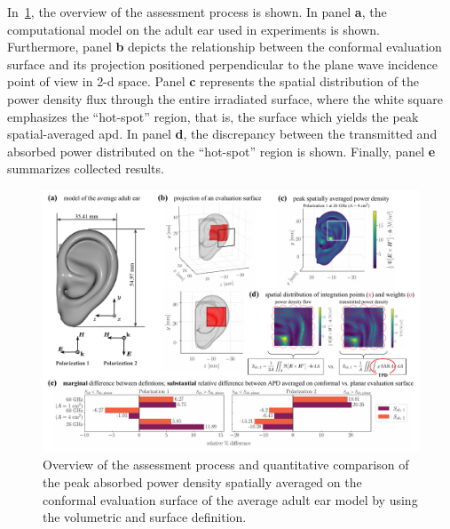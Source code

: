 In~\cref{fig:Kapetanovic2022JERM}, the overview of the assessment process is shown.
In panel \textbf{a}, the computational model on the adult ear used in experiments is shown.
Furthermore, panel \textbf{b} depicts the relationship between the conformal evaluation surface and its projection positioned perpendicular to the plane wave incidence point of view in \gls{2-d} space.
Panel \textbf{c} represents the spatial distribution of the power density flux through the entire irradiated surface, where the white square emphasizes the ``hot-spot'' region, that is, the surface which yields the peak spatial-averaged \gls{apd}.
In panel \textbf{d}, the discrepancy between the transmitted and absorbed power distributed on the ``hot-spot'' region is shown.
Finally, panel \textbf{e} summarizes collected results.
\begin{figure}[ht]
    \begin{center}  
    \includegraphics[width=\textwidth]{artwork/Kapetanovic2022JERM.pdf}
    \caption{Overview of the assessment process and quantitative comparison of the peak absorbed power density spatially averaged on the conformal evaluation surface of the average adult ear model by using the volumetric and surface definition.}
    \label{fig:Kapetanovic2022JERM}
    \end{center}
\end{figure}

